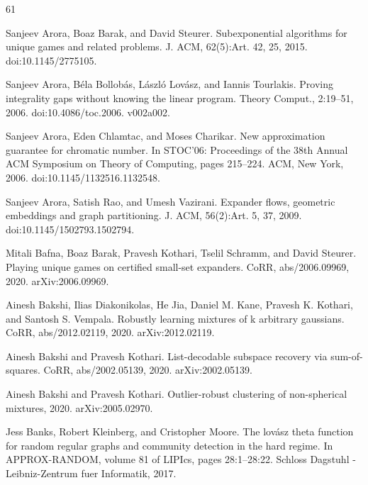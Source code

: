 \documentclass[10pt,a4paper]{article}
\theoremstyle{definition}
\begin{document}
\begin{thebibliography}{61}

Sanjeev Arora, Boaz Barak, and David Steurer. Subexponential algorithms for unique games and related problems. J. ACM, 62(5):Art. 42, 25, 2015. doi:10.1145/2775105.

Sanjeev Arora, Béla Bollobás, László Lovász, and Iannis Tourlakis. Proving integrality gaps without knowing the linear program. Theory Comput., 2:19–51, 2006. doi:10.4086/toc.2006. v002a002.

Sanjeev Arora, Eden Chlamtac, and Moses Charikar. New approximation guarantee for chromatic number. In STOC’06: Proceedings of the 38th Annual ACM Symposium on Theory of Computing, pages 215–224. ACM, New York, 2006. doi:10.1145/1132516.1132548.

Sanjeev Arora, Satish Rao, and Umesh Vazirani. Expander flows, geometric embeddings and graph partitioning. J. ACM, 56(2):Art. 5, 37, 2009. doi:10.1145/1502793.1502794.

Mitali Bafna, Boaz Barak, Pravesh Kothari, Tselil Schramm, and David Steurer. Playing unique games on certified small-set expanders. CoRR, abs/2006.09969, 2020. arXiv:2006.09969.

Ainesh Bakshi, Ilias Diakonikolas, He Jia, Daniel M. Kane, Pravesh K. Kothari, and Santosh S. Vempala. Robustly learning mixtures of k arbitrary gaussians. CoRR, abs/2012.02119, 2020. arXiv:2012.02119.

Ainesh Bakshi and Pravesh Kothari. List-decodable subspace recovery via sum-of-squares. CoRR, abs/2002.05139, 2020. arXiv:2002.05139.

Ainesh Bakshi and Pravesh Kothari. Outlier-robust clustering of non-spherical mixtures, 2020. arXiv:2005.02970.

Jess Banks, Robert Kleinberg, and Cristopher Moore. The lovász theta function for random regular graphs and community detection in the hard regime. In APPROX-RANDOM, volume 81 of LIPIcs, pages 28:1–28:22. Schloss Dagstuhl - Leibniz-Zentrum fuer Informatik, 2017.


\end{thebibliography}
\end{document}

